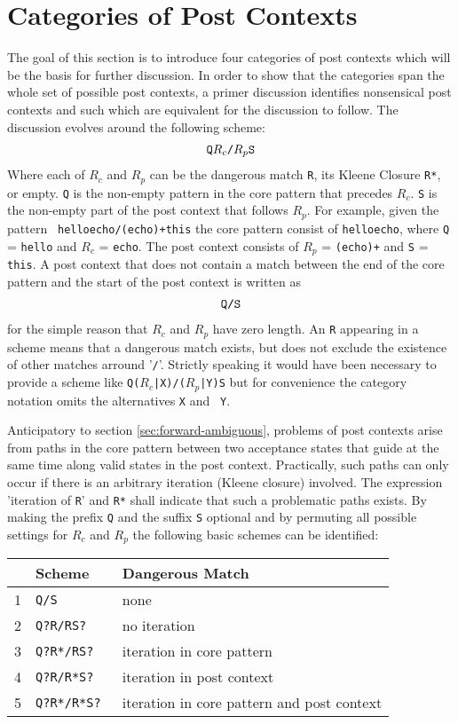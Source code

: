 
\section{Categories of Post Contexts}

The goal of this section is to introduce four categories of post contexts which
will be the basis for further discussion. In order to show that the categories
span the whole set of possible post contexts, a primer discussion identifies
nonsensical post contexts and such which are equivalent for the discussion to
follow. The discussion evolves around the following scheme:
\begin{eqnarray}
\mbox{\tt Q$R_c$/$R_p$S}
\end{eqnarray}
Where each of $R_c$ and $R_p$ can be the dangerous match {\tt R}, its Kleene
Closure \cite{Kleene:1956} {\tt R*}, or empty. {\tt Q} is the non-empty pattern
in the core pattern that precedes $R_c$. {\tt S} is the non-empty part of the
post context that follows $R_p$. For example, given the pattern {\tt
helloecho/(echo)+this} the core pattern consist of {\tt helloecho}, where
{\tt Q} = {\tt hello} and $R_c$ = {\tt echo}. The post context consists of
$R_p$ = {\tt (echo)+} and {\tt S} = {\tt this}. A post context that does
not contain a match between the end of the core pattern and the start of the
post context is written as
\begin{eqnarray}
\mbox{\tt Q/S}
\end{eqnarray}
for the simple reason that $R_c$ and $R_p$ have zero length.  An {\tt R}
appearing in a scheme means that a dangerous match exists, but does not exclude
the existence of other matches arround '\verb|/|'.  Strictly speaking it would
have been necessary to provide a scheme like {\tt Q($R_c$|X)/($R_p$|Y)S} but
for convenience the category notation omits the alternatives {\tt X} and {\tt
    Y}.

Anticipatory to section  \ref{sec:forward-ambiguous},  problems of post
contexts arise from paths in the core pattern between two acceptance 
states that guide at the same time along valid states in the post context. 
Practically, such paths can only occur if there is an arbitrary iteration 
(Kleene closure) involved. The expression 'iteration of {\tt R}'
and {\tt R*} shall indicate that such a problematic paths exists. 
By making the prefix {\tt Q} and the suffix {\tt S} optional and by
permuting all possible settings for $R_c$ and $R_p$ the
following basic schemes can be identified:

\begin{center}
\begin{tabular}{rll}
  & \bf Scheme    & \bf Dangerous Match    \\ \hline 
1 & \tt Q/S       & none\\ 
2 & \tt Q?R/RS?   & no iteration\\ 
3 & \tt Q?R*/RS?  & iteration in core pattern\\ 
4 & \tt Q?R/R*S?  & iteration in post context\\
5 & \tt Q?R*/R*S? & iteration in core pattern and post context\\ \hline
\end{tabular}
\end{center}

